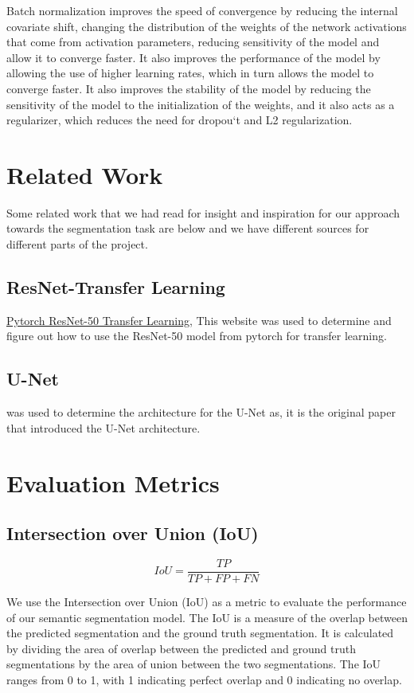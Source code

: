 \documentclass{article}
\begin{document}
Batch normalization improves the speed of convergence by reducing the internal covariate shift, changing the distribution of the weights of the network activations that come from activation parameters, reducing sensitivity of the model and allow it to converge faster. It also improves the performance of the model by allowing the use of higher learning rates, which in turn allows the model to converge faster. It also improves the stability of the model by reducing the sensitivity of the model to the initialization of the weights, and it also acts as a regularizer, which reduces the need for dropou`t and L2 regularization.

\section{Related Work}
Some related work that we had read for insight and inspiration for our approach towards the segmentation task are below and we have different sources for different parts of the project.

\subsection{ResNet-Transfer Learning}
\href{https://pytorch.org/hub/nvidia_deeplearningexamples_resnet50/}{Pytorch ResNet-50 Transfer Learning},
This website was used to determine and figure out how to use the ResNet-50 model from pytorch for transfer learning.


\subsection{U-Net}
\cite{ronneberger2015u}
was used to determine the architecture for the U-Net as, it is the original paper that introduced the U-Net architecture.

\section{Evaluation Metrics}
\subsection{Intersection over Union (IoU)}
\begin{equation}
  IoU = \frac{TP}{TP + FP + FN}
\end{equation}

We use the Intersection over Union (IoU) as a metric to evaluate the performance of our semantic segmentation model. The IoU is a measure of the overlap between the predicted segmentation and the ground truth segmentation. It is calculated by dividing the area of overlap between the predicted and ground truth segmentations by the area of union between the two segmentations. The IoU ranges from 0 to 1, with 1 indicating perfect overlap and 0 indicating no overlap.
\end{document}
